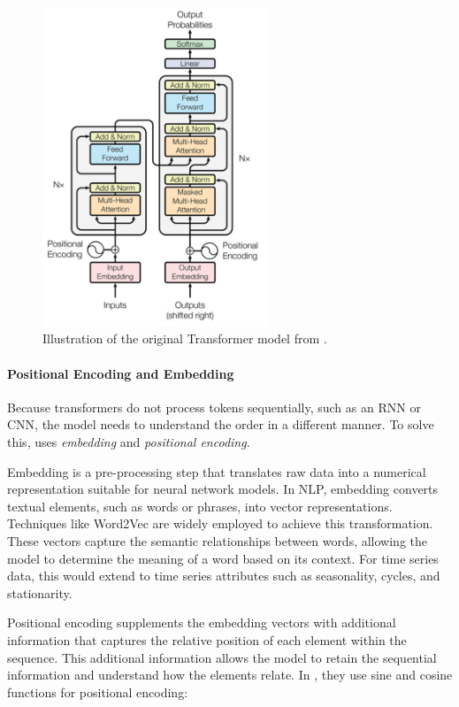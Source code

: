 \documentclass[12pt,a4paper]{article}
\begin{document}
\begin{figure}[htbp]
  \centering
  \includegraphics[width=0.6\textwidth]{transformer.png}
  \caption{Illustration of the original Transformer model from \cite{Vaswani2017}.}
  \label{transformer}
\end{figure}

\paragraph{Positional Encoding and Embedding}
Because transformers do not process tokens sequentially, such as an RNN or CNN, the model needs to understand the order in a different manner. To solve this, \cite{Vaswani2017} uses \textit{embedding} and \textit{positional encoding}.

Embedding is a pre-processing step that translates raw data into a numerical representation suitable for neural network models. In NLP, embedding converts textual elements, such as words or phrases, into vector representations. Techniques like Word2Vec are widely employed to achieve this transformation. These vectors capture the semantic relationships between words, allowing the model to determine the meaning of a word based on its context. For time series data, this would extend to time series attributes such as seasonality, cycles, and stationarity.

Positional encoding supplements the embedding vectors with additional information that captures the relative position of each element within the sequence. This additional information allows the model to retain the sequential information and understand how the elements relate. In \cite{Vaswani2017}, they use sine and cosine functions for positional encoding:
\end{document}
